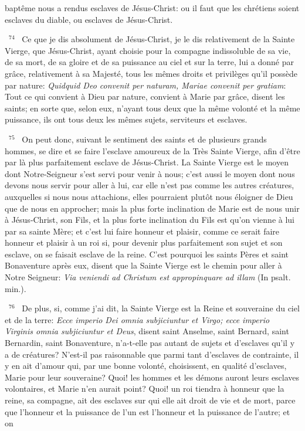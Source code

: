 \documentclass[paper=a5,pagesize=pdftex,fontsize=15pt,headinclude=on,twoside=off]{scrbook}
\newcommand{\negphantom}[1]{\settowidth{\dimen0}{#1}\hspace*{-\dimen0}}
\newcommand{\versenb}[1]{\par \vspace{10pt}~\negphantom{~${}^{#1}$~}${}^{#1}$~}
\newcommand{\latin}[1]{\emph{#1}}
\begin{document}
baptême nous a rendus esclaves de Jésus-Christ: ou il faut que les chrétiens soient esclaves du diable, ou
esclaves de Jésus-Christ.
\versenb{74} Ce que je dis absolument de Jésus-Christ, je le dis relativement de la Sainte Vierge, que Jésus-Christ, ayant
choisie pour la compagne indissoluble de sa vie, de sa mort, de sa gloire et de sa puissance au ciel et sur la terre,
lui a donné par grâce, relativement à sa Majesté, tous les mêmes droits et privilèges qu'il possède par nature:
\latin{Quidquid Deo convenit per naturam, Mariae convenit per gratiam}: Tout ce qui convient à Dieu par nature, convient
à Marie par grâce, disent les saints; en sorte que, selon eux, n'ayant tous deux que la même volonté et la même
puissance, ils ont tous deux les mêmes sujets, serviteurs et esclaves.
\versenb{75} On peut donc, suivant le sentiment des saints et de plusieurs grands hommes, se dire et se faire l'esclave
amoureux de la Très Sainte Vierge, afin d'être par là plus parfaitement esclave de Jésus-Christ. La Sainte Vierge
est le moyen dont Notre-Seigneur s'est servi pour venir à nous; c'est aussi le moyen dont nous devons nous servir
pour aller à lui, car elle n'est pas comme les autres créatures, auxquelles si nous nous attachions, elles pourraient
plutôt nous éloigner de Dieu que de nous en approcher; mais la plus forte inclination de Marie est de nous unir à
Jésus-Christ, son Fils, et la plus forte inclination du Fils est qu'on vienne à lui par sa sainte Mère; et c'est lui faire
honneur et plaisir, comme ce serait faire honneur et plaisir à un roi si, pour devenir plus parfaitement son sujet et
son esclave, on se faisait esclave de la reine. C'est pourquoi les saints Pères et saint Bonaventure après eux,
disent que la Sainte Vierge est le chemin pour aller à Notre Seigneur: \latin{Via veniendi ad Christum est appropinquare
ad illam} (In psalt. min.).
\versenb{76} De plus, si, comme j'ai dit, la Sainte Vierge est la Reine et souveraine du ciel et de la terre: \latin{Ecce imperio Dei
omnia subjiciuntur et Virgo; ecce imperio Virginis omnia subjiciuntur et Deus}, disent saint Anselme, saint Bernard,
saint Bernardin, saint Bonaventure, n'a-t-elle pas autant de sujets et d'esclaves qu'il y a de créatures? N'est-il pas
raisonnable que parmi tant d'esclaves de contrainte, il y en ait d'amour qui, par une bonne volonté, choisissent, en
qualité d'esclaves, Marie pour leur souveraine? Quoi! les hommes et les démons auront leurs esclaves volontaires,
et Marie n'en aurait point? Quoi! un roi tiendra à honneur que la reine, sa compagne, ait des esclaves sur qui elle
ait droit de vie et de mort, parce que l'honneur et la puissance de l'un est l'honneur et la puissance de l'autre; et on
\end{document}
